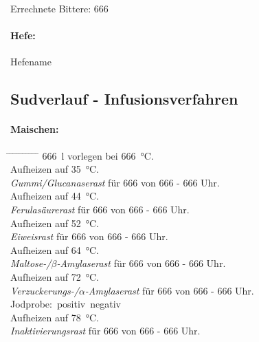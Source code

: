 \documentclass[12pt,oneside,a4paper]{scrartcl}
\begin{document}
\vspace{.25cm}
\hspace{1cm}Errechnete Bittere: \SI{666}{\IBU}
%
\paragraph{Hefe:} 
	Hefename

\pagebreak[3]
\subsection*{Sudverlauf - Infusionsverfahren}	
%
\paragraph{Maischen:}
	\begin{tabbing}\hspace{1cm} \=
		\hspace{1cm} \= \hspace{1cm} \=\hspace{1cm} \=\hspace{1cm} \=\hspace{1cm} \= \hspace{1cm} \= \hspace{1cm} \= \hspace{1cm} \= \hspace{1cm} \= \kill
		\>\SI{666}{\litre} vorlegen bei \SI{666}{\celsius}.\\
		\> \>Aufheizen auf \SI{35}{\celsius}.\\
		\>\textit{Gummi/Glucanaserast} für \SI{666}{\Min} von 666 - 666 Uhr.\\
		\> \>Aufheizen auf \SI{44}{\celsius}.\\
		\>\textit{Ferulasäurerast} für \SI{666}{\Min} von 666 - 666 Uhr.\\
		\> \>Aufheizen auf \SI{52}{\celsius}.\\
		\>\textit{Eiweisrast} für \SI{666}{\Min} von 666 - 666 Uhr.\\
		\> \>Aufheizen auf \SI{64}{\celsius}.\\
		\>\textit{Maltose-/$\beta$-Amylaserast} für \SI{666}{\Min} von 666 - 666 Uhr.\\
		\> \>Aufheizen auf \SI{72}{\celsius}.\\
		\>\textit{Verzuckerungs-/$\alpha$-Amylaserast} für \SI{666}{\Min} von 666 - 666 Uhr.\\
		\> \> \>Jodprobe: \> \> \Square\,positiv \> \> \CheckedBox\,negativ\\
		\> \>Aufheizen auf \SI{78}{\celsius}.\\
		\>\textit{Inaktivierungsrast} für \SI{666}{\Min} von 666 - 666 Uhr.
	\end{tabbing}
\end{document}
